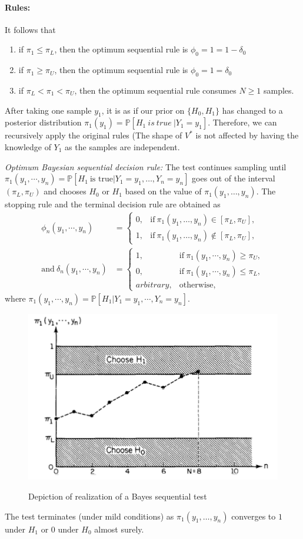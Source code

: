 \documentclass[a4paper,english,12pt]{article}
\newcommand{\te}{\textrm}
\begin{document}
\paragraph{Rules:} It follows that
\begin{enumerate}
\item if $\pi_1\leq\pi_L$, then the optimum sequential rule is $\phi_0=1=1-\delta_0$
\item if $\pi_1\geq\pi_U$, then the optimum sequential rule is $\phi_0=1=\delta_0$
\item if $\pi_L<\pi_1<\pi_U$, then the optimum sequential rule consumes $N\geq1$ samples.
\end{enumerate}
After taking one sample $y_1$, it is as if our prior on $\{H_0,H_1\}$ has changed to a posterior distribution
$\pi_1(y_1)=\mathbb{P}[H_1\ is\ true\ | Y_1=y_1]$. Therefore, we can recursively apply the original rules (The shape of $V^*$ is not affected by having the knowledge of $Y_1$ as the samples are independent.
\par \emph{Optimum Bayesian sequential decision rule:} The test continues sampling until $\pi_1(y_1,\cdots,y_n)=\mathbb{P}[H_1\ \te{is\ true}|Y_1=y_1,\dots,Y_n=y_n]$ goes out of the interval $(\pi_L,\pi_U)$ and chooses $H_0$ or $H_1$ based on the value of $\pi_1(y_1,\dots,y_n)$. The stopping rule and the terminal decision rule are obtained as
\begin{align}
\phi_n(y_1,\cdots,y_n)&= \begin{cases}0, &\text{if}\  \pi_1(y_1,\dots,y_n)\in [\pi_L,\pi_U],\\1, &\text{if}\  \pi_1(y_1,\dots,y_n)\notin [\pi_L,\pi_U],
\end{cases}\\ \te{and}~\delta_n(y_1,\cdots,y_n)&= \begin{cases}1, & \text{if}\  \pi_1(y_1,\cdots,y_n)\geq \pi_U,\\0,  & \text{if}\  \pi_1(y_1,\cdots,y_n)\leq \pi_L,\\arbitrary, &  \text{otherwise,}\end{cases}
\end{align}
where $\pi_1(y_1,\cdots,y_n)=\mathbb{P}[H_1|Y_1=y_1,\cdots,Y_n=y_n]$.\\
\begin{figure}
\centering
\includegraphics[scale=0.7]{Figures/bayesseqtest.png}\\
\caption{Depiction of realization of a Bayes sequential test}
\end{figure}
The test terminates (under mild conditions) as $\pi_1(y_1,\dots,y_n)$ converges to $1$ under $H_1$ or $0$ under $H_0$ almost surely.
\end{document}

